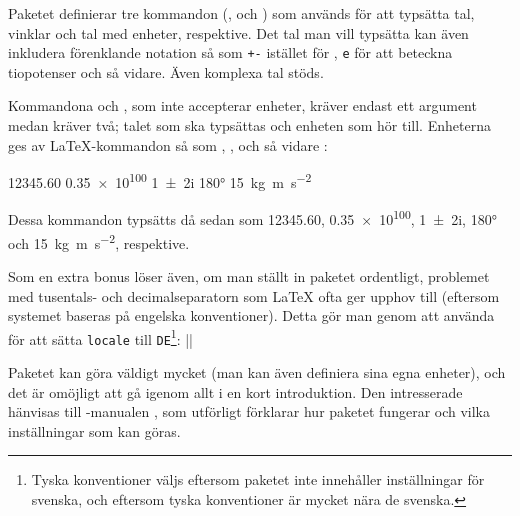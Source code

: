 \documentclass[../../a4.tex]{subfiles}
\begin{document}
Paketet definierar tre kommandon (,  och ) som
används för att typsätta tal, vinklar och tal med enheter, respektive. Det
tal man vill typsätta kan även inkludera förenklande notation så som
\texttt{+-} istället för , \texttt{e} för att beteckna tiopotenser
och så vidare. Även komplexa tal stöds.

Kommandona  och , som inte accepterar enheter, kräver
endast ett argument medan  kräver två; talet som ska typsättas
och enheten som hör till. Enheterna ges av \LaTeX-kommandon så som
, ,  och så vidare
:
\begin{latexcode}
\num{12345,60} %
\num{.35e100} %
\num{1+-2i}   %
\ang{180}     %
\SI{15}{\kilogram\metre\per\second\squared} %
\end{latexcode}
Dessa kommandon typsätts då sedan som
\num{12345,60}, %
\num{.35e100}, %
\num{1+-2i},   %
\ang{180} och     %
\SI{15}{\kilogram\metre\per\second\squared},
respektive.

Som en extra bonus löser  även, om man ställt in paketet
ordentligt, problemet med tusentals- och decimalseparatorn som \LaTeX{}
ofta ger upphov till (eftersom systemet baseras på engelska konventioner).
Detta gör man genom att använda  för att sätta 
\texttt{locale} till \texttt{DE}\footnote{Tyska konventioner väljs 
eftersom  paketet inte innehåller inställningar för svenska, och eftersom 
tyska konventioner är mycket nära de svenska.}:
\latex||

Paketet kan göra väldigt mycket (man kan även definiera sina egna
enheter), och det är omöjligt att gå igenom allt i en kort introduktion.
Den intresserade hänvisas till -manualen \cite{Wright11},
som utförligt förklarar hur paketet fungerar och vilka inställningar som
kan göras.
\end{document}
